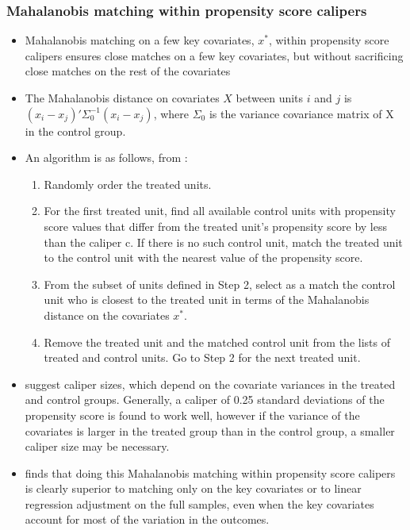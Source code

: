\documentclass[11pt,titlepage]{article}
\begin{document}
\subsubsection{Mahalanobis matching within propensity score calipers}
\begin{itemize} 
\item Mahalanobis matching on a few key covariates, $x^*$, within
  propensity score calipers ensures close matches on a few key
  covariates, but without sacrificing close matches on the rest of the
  covariates
\item The Mahalanobis distance on covariates $X$ between units $i$ and
  $j$ is $(x_i-x_j)'\Sigma_{0}^{-1}(x_i-x_j)$, where $\Sigma_0$ is the
  variance covariance matrix of X in the control group.
\item An algorithm is as follows, from \cite{RubTho00}:
\begin{enumerate}
\item Randomly order the treated units.
\item For the first treated unit, find all available control units
  with propensity score values that differ from the treated unit's
  propensity score by less than the caliper c.  If there is no such
  control unit, match the treated unit to the control unit with the
  nearest value of the propensity score.
\item From the subset of units defined in Step 2, select as a match
  the control unit who is closest to the treated unit in terms of the
  Mahalanobis distance on the covariates $x^*$.
\item Remove the treated unit and the matched control unit from the
  lists of treated and control units.  Go to Step 2 for the next
  treated unit.
\end{enumerate}
\item \cite{RosRub85a} suggest caliper sizes, which depend on the
  covariate variances in the treated and control groups.  Generally, a
  caliper of 0.25 standard deviations of the propensity score is found
  to work well, however if the variance of the covariates is larger in
  the treated group than in the control group, a smaller caliper size
  may be necessary.
\item \cite{RubTho00} finds that doing this Mahalanobis matching
  within propensity score calipers is clearly superior to matching
  only on the key covariates or to linear regression adjustment on the
  full samples, even when the key covariates account for most of the
  variation in the outcomes.
\end{itemize}
\end{document}
